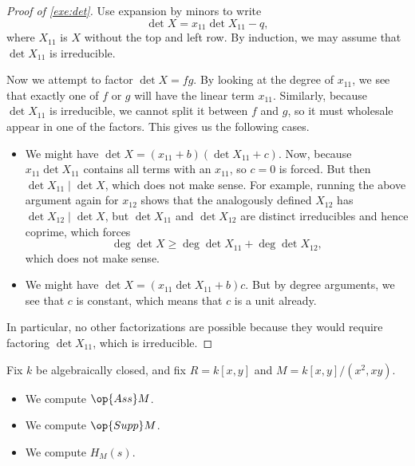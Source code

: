 \documentclass[../notes.tex]{subfiles}
\begin{document}
\begin{proof}[Proof of \autoref{exe:det}]
	Use expansion by minors to write
	\[\det X=x_{11}\det X_{11}-q,\]
	where $X_{11}$ is $X$ without the top and left row. By induction, we may assume that $\det X_{11}$ is irreducible.
	
	Now we attempt to factor $\det X=fg$. By looking at the degree of $x_{11}$, we see that exactly one of $f$ or $g$ will have the linear term $x_{11}$. Similarly, because $\det X_{11}$ is irreducible, we cannot split it between $f$ and $g$, so it must wholesale appear in one of the factors. This gives us the following cases.
	\begin{itemize}
		\item We might have $\det X=(x_{11}+b)(\det X_{11}+c)$. Now, because $x_{11}\det X_{11}$ contains all terms with an $x_{11}$, so $c=0$ is forced. But then $\det X_{11}\mid\det X$, which does not make sense. For example, running the above argument again for $x_{12}$ shows that the analogously defined $X_{12}$ has $\det X_{12}\mid\det X$, but $\det X_{11}$ and $\det X_{12}$ are distinct irreducibles and hence coprime, which forces
		\[\deg\det X\ge\deg\det X_{11}+\deg\det X_{12},\]
		which does not make sense.
		\item We might have $\det X=(x_{11}\det X_{11}+b)c$. But by degree arguments, we see that $c$ is constant, which means that $c$ is a unit already.
	\end{itemize}
	In particular, no other factorizations are possible because they would require factoring $\det X_{11}$, which is irreducible.
\end{proof}
\begin{exe}
	Fix $k$ be algebraically closed, and fix $R=k[x,y]$ and $M=k[x,y]/\left(x^2,xy\right)$.
	\begin{itemize}
		\item We compute $\op{Ass}M$.
		\item We compute $\op{Supp}M$.
		\item We compute $H_M(s)$.
	\end{itemize}
\end{exe}
\end{document}
